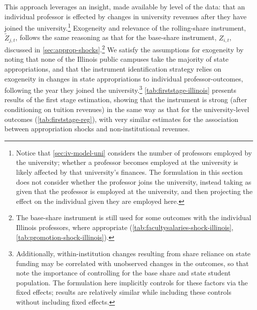 \documentclass[notitlepage,12pt]{article}
\renewcommand{\tilde}[1]{\widetilde{#1}}                                   %
\begin{document}
This approach leverages an insight, made available by level of the data: that an individual professor is effected by changes in university revenues after they have joined the university.\footnote{
    Notice that \autoref{sec:iv-model-uni} considers the number of professors employed by the university; whether a professor becomes employed at the university is likely affected by that university's finances.
    The formulation in this section does not consider whether the professor joins the university, instead taking as given that the professor is employed at the university, and then projecting the effect on the individual given they are employed here.
}
Exogeneity and relevance of the rolling-share instrument, $\tilde Z_{j,t}$, follows the same reasoning as that for the base-share instrument, $Z_{i,t}$, discussed in \autoref{sec:approp-shocks}.\footnote{
    The base-share instrument is still used for some outcomes with the individual Illinois professors, where appropriate (\autoref{tab:facultysalaries-shock-illinois}, \autoref{tab:promotion-shock-illinois}).
}
We satisfy the assumptions for exogeneity by noting that none of the Illinois public campuses take the majority of state appropriations, and that the instrument identification strategy relies on exogeneity in changes in state appropriations to individual professor-outcomes, following the year they joined the university.\footnote{
    Additionally, within-institution changes resulting from share reliance on state funding may be correlated with unobserved changes in the outcomes, so that \cite{NBERw27885} note the importance of controlling for the base share and state student population.
    The formulation here implicitly controls for these factors via the fixed effects; results are relatively similar while including these controls without including fixed effects.
}
\autoref{tab:firststage-illinois} presents results of the first stage estimation, showing that the instrument is strong (after conditioning on tuition revenues) in the same way as that for the university-level outcomes (\autoref{tab:firststage-reg}), with very similar estimates for the association between appropriation shocks and non-institutional revenues.
\end{document}
